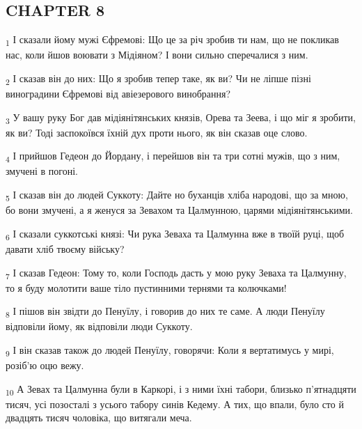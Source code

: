 \subsection{CHAPTER 8}
\begin{tcolorbox}
\textsubscript{1} І сказали йому мужі Єфремові: Що це за річ зробив ти нам, що не покликав нас, коли йшов воювати з Мідіяном? І вони сильно сперечалися з ним.
\end{tcolorbox}
\begin{tcolorbox}
\textsubscript{2} І сказав він до них: Що я зробив тепер таке, як ви? Чи не ліпше пізні виноградини Єфремові від авіезерового винобрання?
\end{tcolorbox}
\begin{tcolorbox}
\textsubscript{3} У вашу руку Бог дав мідіянітянських князів, Орева та Зеева, і що міг я зробити, як ви? Тоді заспокоївся їхній дух проти нього, як він сказав оце слово.
\end{tcolorbox}
\begin{tcolorbox}
\textsubscript{4} І прийшов Гедеон до Йордану, і перейшов він та три сотні мужів, що з ним, змучені в погоні.
\end{tcolorbox}
\begin{tcolorbox}
\textsubscript{5} І сказав він до людей Суккоту: Дайте но буханців хліба народові, що за мною, бо вони змучені, а я женуся за Зевахом та Цалмунною, царями мідіянітянськими.
\end{tcolorbox}
\begin{tcolorbox}
\textsubscript{6} І сказали суккотські князі: Чи рука Зеваха та Цалмунна вже в твоїй руці, щоб давати хліб твоєму війську?
\end{tcolorbox}
\begin{tcolorbox}
\textsubscript{7} І сказав Гедеон: Тому то, коли Господь дасть у мою руку Зеваха та Цалмунну, то я буду молотити ваше тіло пустинними тернями та колючками!
\end{tcolorbox}
\begin{tcolorbox}
\textsubscript{8} І пішов він звідти до Пенуїлу, і говорив до них те саме. А люди Пенуїлу відповіли йому, як відповіли люди Суккоту.
\end{tcolorbox}
\begin{tcolorbox}
\textsubscript{9} І він сказав також до людей Пенуїлу, говорячи: Коли я вертатимусь у мирі, розіб'ю оцю вежу.
\end{tcolorbox}
\begin{tcolorbox}
\textsubscript{10} А Зевах та Цалмунна були в Каркорі, і з ними їхні табори, близько п'ятнадцяти тисяч, усі позосталі з усього табору синів Кедему. А тих, що впали, було сто й двадцять тисяч чоловіка, що витягали меча.
\end{tcolorbox}
